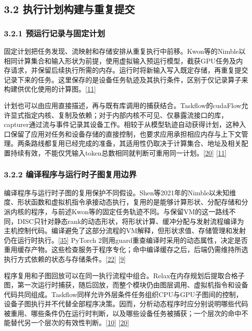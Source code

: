 \documentclass[
  11pt,
  UTF8]{ctexart}
\begin{document}
\hypertarget{section-3-2}{%
\subsection{3.2 执行计划构建与重复提交}\label{section-3-2}}

\hypertarget{section-3-2-1}{%
\subsubsection{3.2.1 预运行记录与固定计划}\label{section-3-2-1}}

固定计划把任务发现、流映射和存储安排从重复执行中前移。Kwon等的Nimble以相同计算集合和输入形状为前提，使用虚拟输入预运行模型，截获GPU任务及内存请求，并保留后续执行所需的内存。运行时将新输入写入既定存储，再重复提交记录下来的任务。这里保存的是设备任务轨迹及其执行条件，区别于仅记录算子来构建供优化使用的计算图。{[}\protect\hyperlink{ref-kwon2020nimble}{11}{]}

计划也可以由应用直接描述，再与既有库调用的捕获结合。Taskflow的cudaFlow允许显式指定内核、复制及依赖；对于内部内核不可见、仅暴露流接口的库，capturer通过流与事件记录其设备工作。相较于从模型轨迹自动获得计划，这种入口保留了应用对任务和设备存储的直接控制，也要求应用承担相应内存与上下文管理。两条路线都复用已经完成的准备，其适用性仍取决于计算集合、地址及相关配置持续有效，不能仅凭输入token总数相同就判断可重用同一计划。{[}\protect\hyperlink{ref-huang2022taskflow}{20}{]}
{[}\protect\hyperlink{ref-kwon2020nimble}{11}{]}

\hypertarget{section-3-2-2}{%
\subsubsection{3.2.2 编译程序与运行时子图复用边界}\label{section-3-2-2}}

编译程序与运行时子图的复用保护不同假设。Shen等2021年的Nimble以未知维度、形状函数和虚拟机指令承接动态执行，复用的是能够计算形状、分配存储和分派内核的程序，与前述Kwon等的固定任务轨迹不同。与保留VM的这一路线不同，DISC只针对静态rank的动态形状，将形状计算、缓冲分配与发射流程编译为主机控制代码。编译避免了这部分流程的VM解释，但形状求值、存储管理和发射仍在运行时执行。{[}\protect\hyperlink{ref-zhu2021disc}{35}{]}
PyTorch
2则用guard重查编译时采用的动态属性，决定是否重用缓存产物。这些检查服务于程序专化；命中编译缓存之后，后端仍需维持所选执行方式依赖的状态与存储条件。{[}\protect\hyperlink{ref-shen2021nimble}{22}{]}
{[}\protect\hyperlink{ref-ansel2024pytorch2}{9}{]}

程序复用和子图回放可以在同一执行流程中组合。Relax在内存规划后提取合格子图，第一次运行时捕获，随后回放，而整个模块仍由图层调用、虚拟机指令和设备代码共同组成。Taskflow同样允许外层条件任务组织CPU与GPU子图间的控制，设备子图执行并不代替全部程序决策。因而，分析动态程序时应分别说明哪些代码被重用、哪些条件仍在运行时判断，以及哪些设备任务被捕获；一个层次的命中不能替代另一个层次的有效性判断。{[}\protect\hyperlink{ref-lai2025relax}{10}{]}
{[}\protect\hyperlink{ref-huang2022taskflow}{20}{]}
\end{document}
